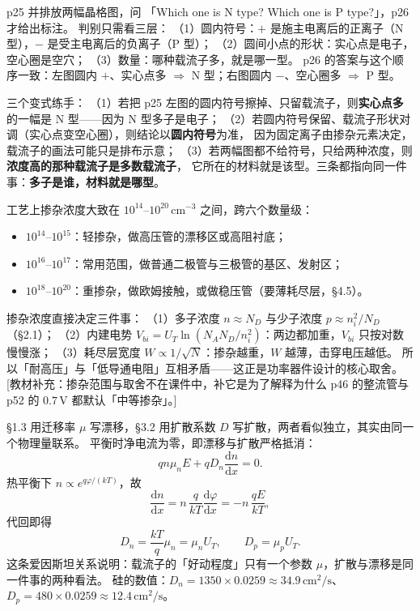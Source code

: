 \documentclass[11pt]{ctexart}
\begin{document}

p25 并排放两幅晶格图，问 「Which one is N type? Which one is P type?」，p26 才给出标注。
判别只需看三层：
（1）圆内符号：$+$ 是施主电离后的正离子（N 型），$-$ 是受主电离后的负离子（P 型）；
（2）圆间小点的形状：实心点是电子，空心圈是空穴；
（3）数量：哪种载流子多，就是哪一型。
p26 的答案与这个顺序一致：左图圆内 $+$、实心点多 $\Rightarrow$ N 型；右图圆内 $-$、空心圈多 $\Rightarrow$ P 型。

三个变式练手：
（1）若把 p25 左图的圆内符号擦掉、只留载流子，则\textbf{实心点多}的一幅是 N 型——因为 N 型多子是电子；
（2）若圆内符号保留、载流子形状对调（实心点变空心圈），则结论以\textbf{圆内符号}为准，
因为固定离子由掺杂元素决定，载流子的画法可能只是排布示意；
（3）若两幅图都不给符号，只给两种浓度，则\textbf{浓度高的那种载流子是多数载流子}，
它所在的材料就是该型。三条都指向同一件事：\textbf{多子是谁，材料就是哪型}。


工艺上掺杂浓度大致在 $10^{14}$--$10^{20}\,\mathrm{cm^{-3}}$ 之间，跨六个数量级：
\begin{itemize}
\item $10^{14}$--$10^{15}$：轻掺杂，做高压管的漂移区或高阻衬底；
\item $10^{16}$--$10^{17}$：常用范围，做普通二极管与三极管的基区、发射区；
\item $10^{18}$--$10^{20}$：重掺杂，做欧姆接触，或做稳压管（要薄耗尽层，§4.5）。
\end{itemize}

掺杂浓度直接决定三件事：
（1）多子浓度 $n\approx N_D$ 与少子浓度 $p\approx n_i^2/N_D$（§2.1）；
（2）内建电势 $V_{bi}=U_T\ln(N_A N_D/n_i^2)$：两边都加重，$V_{bi}$ 只按对数慢慢涨；
（3）耗尽层宽度 $W\propto1/\sqrt{N}$：掺杂越重，$W$ 越薄，击穿电压越低。
所以「耐高压」与「低导通电阻」互相矛盾——这正是功率器件设计的核心取舍。
[教材补充：掺杂范围与取舍不在课件中，补它是为了解释为什么 p46 的整流管与 p52 的 $0.7\,\mathrm{V}$ 都默认「中等掺杂」。]


§1.3 用迁移率 $\mu$ 写漂移，§3.2 用扩散系数 $D$ 写扩散，两者看似独立，其实由同一个物理量联系。
平衡时净电流为零，即漂移与扩散严格抵消：
\[
q n\mu_n E+qD_n\frac{\mathrm{d}n}{\mathrm{d}x}=0 .
\]
热平衡下 $n\propto e^{q\varphi/(kT)}$，故
\[
\frac{\mathrm{d}n}{\mathrm{d}x}=n\,\frac{q}{kT}\frac{\mathrm{d}\varphi}{\mathrm{d}x}
=-n\,\frac{qE}{kT},
\]
代回即得
\[
D_n=\frac{kT}{q}\mu_n=\mu_nU_T,\qquad D_p=\mu_pU_T .
\]
这条爱因斯坦关系说明：载流子的「好动程度」只有一个参数 $\mu$，扩散与漂移是同一件事的两种看法。
硅的数值：$D_n=1350\times0.0259\approx34.9\,\mathrm{cm^2/s}$、
$D_p=480\times0.0259\approx12.4\,\mathrm{cm^2/s}$。
\end{document}
